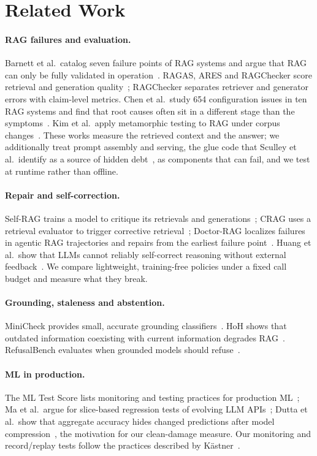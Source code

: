 \section{Related Work}\label{sec:related}

\paragraph{RAG failures and evaluation.} Barnett et al.\ catalog seven failure points of RAG systems
and argue that RAG can only be fully validated in operation~\cite{barnett2024seven}. RAGAS, ARES and
RAGChecker score retrieval and generation quality~\cite{es2024ragas,saadfalcon2024ares,ru2024ragchecker};
RAGChecker separates retriever and generator errors with claim-level metrics. Chen et al.\ study 654
configuration issues in ten RAG systems and find that root causes often sit in a different stage
than the symptoms~\cite{chen2026configuring}. Kim et al.\ apply metamorphic testing to RAG under
corpus changes~\cite{kim2026knowledge}. These works measure the retrieved context and the answer;
we additionally treat prompt assembly and serving, the glue code that Sculley et al.\ identify as a
source of hidden debt~\cite{sculley2015debt}, as components that can fail, and we test at runtime
rather than offline.

\paragraph{Repair and self-correction.} Self-RAG trains a model to critique its retrievals and
generations~\cite{asai2024selfrag}; CRAG uses a retrieval evaluator to trigger corrective
retrieval~\cite{yan2024crag}; Doctor-RAG localizes failures in agentic RAG trajectories and repairs
from the earliest failure point~\cite{jiao2026doctorrag}. Huang et al.\ show that LLMs cannot
reliably self-correct reasoning without external feedback~\cite{huang2024selfcorrect}. We compare
lightweight, training-free policies under a fixed call budget and measure what they break.

\paragraph{Grounding, staleness and abstention.} MiniCheck provides small, accurate grounding
classifiers~\cite{tang2024minicheck}. HoH shows that outdated information coexisting with current
information degrades RAG~\cite{ouyang2025hoh}. RefusalBench evaluates when grounded models should
refuse~\cite{muhamed2026refusalbench}.

\paragraph{ML in production.} The ML Test Score lists monitoring and testing practices for
production ML~\cite{breck2017mltestscore}; Ma et al.\ argue for slice-based regression tests of
evolving LLM APIs~\cite{ma2024prompt}; Dutta et al.\ show that aggregate accuracy hides changed
predictions after model compression~\cite{dutta2024accuracy}, the motivation for our clean-damage
measure. Our monitoring and record/replay tests follow the practices described by
K\"astner~\cite{kastner2025mlip}.
